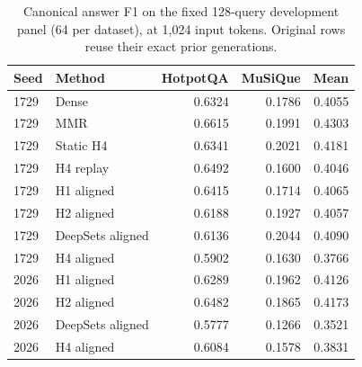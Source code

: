 \begin{table}[t]\centering\small
\caption{Canonical answer F1 on the fixed 128-query development panel (64 per dataset), at 1,024 input tokens. Original rows reuse their exact prior generations.}
\label{tab:qa}
\begin{tabular}{llrrr}\toprule
Seed & Method & HotpotQA & MuSiQue & Mean\\\midrule
1729 & Dense & 0.6324 & 0.1786 & 0.4055\\
1729 & MMR & 0.6615 & 0.1991 & 0.4303\\
1729 & Static H4 & 0.6341 & 0.2021 & 0.4181\\
1729 & H4 replay & 0.6492 & 0.1600 & 0.4046\\
1729 & H1 aligned & 0.6415 & 0.1714 & 0.4065\\
1729 & H2 aligned & 0.6188 & 0.1927 & 0.4057\\
1729 & DeepSets aligned & 0.6136 & 0.2044 & 0.4090\\
1729 & H4 aligned & 0.5902 & 0.1630 & 0.3766\\
2026 & H1 aligned & 0.6289 & 0.1962 & 0.4126\\
2026 & H2 aligned & 0.6482 & 0.1865 & 0.4173\\
2026 & DeepSets aligned & 0.5777 & 0.1266 & 0.3521\\
2026 & H4 aligned & 0.6084 & 0.1578 & 0.3831\\
\bottomrule\end{tabular}\end{table}
